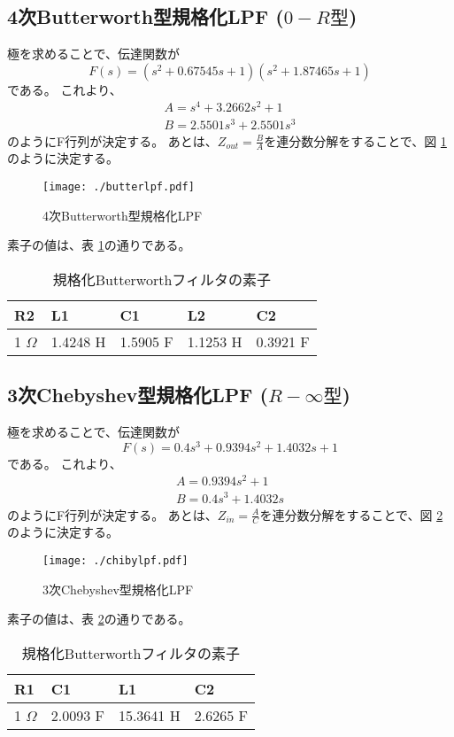 \documentclass[a4j,twocolumn]{jsarticle}
\begin{document}
\subsection{4次Butterworth型規格化LPF ($0-R 型$)}
極を求めることで、伝達関数が
\begin{equation}
    F(s) = (s^{2} + 0.67545s + 1)(s^{2} + 1.87465s + 1)
\end{equation} 
である。
これより、
\begin{gather}
A = s^{4} + 3.2662s^{2} + 1 \\
B = 2.5501s^{3} + 2.5501s^{3}
\end{gather}
のようにF行列が決定する。
あとは、$Z_{out} = \frac{B}{A}$を連分数分解をすることで、図 \ref{butter}のように決定する。
\begin{figure}[H]
    \centering
   \texttt{[image: ./butterlpf.pdf]}
   \caption{4次Butterworth型規格化LPF}
    \label{butter}
\end{figure}
素子の値は、表 \ref{butterhyou}の通りである。
\begin{table}
    \centering
    \caption{規格化Butterworthフィルタの素子}
    \begin{tabular}{@{}lllll@{}} \toprule
    R2 & L1 & C1 & L2 & C2 \\ \midrule
    1 $\Omega$ & 1.4248 H & 1.5905 F & 1.1253 H & 0.3921 F \\ \bottomrule
    \end{tabular} 
    \label{butterhyou}
\end{table}

\subsection{3次Chebyshev型規格化LPF ($R-\infty 型$)}
極を求めることで、伝達関数が
\begin{equation}
    F(s) = 0.4s^{3} + 0.9394s^{2} + 1.4032s + 1
\end{equation} 
である。
これより、
\begin{gather}
A = 0.9394s^{2} + 1\\
B = 0.4s^{3} + 1.4032s
\end{gather}
のようにF行列が決定する。
あとは、$Z_{in} = \frac{A}{C}$を連分数分解をすることで、図 \ref{cheby}のように決定する。
\begin{figure}[H]
    \centering
   \texttt{[image: ./chibylpf.pdf]}
   \caption{3次Chebyshev型規格化LPF}
    \label{cheby}
\end{figure}
素子の値は、表 \ref{che}の通りである。
\begin{table}
    \centering
    \caption{規格化Butterworthフィルタの素子}
    \begin{tabular}{@{}llll@{}} \toprule
    R1 & C1 & L1 & C2  \\ \midrule
    1 $\Omega$ & 2.0093 F & 15.3641 H & 2.6265 F \\ \bottomrule
    \end{tabular} 
    \label{che}
\end{table}
\end{document}
